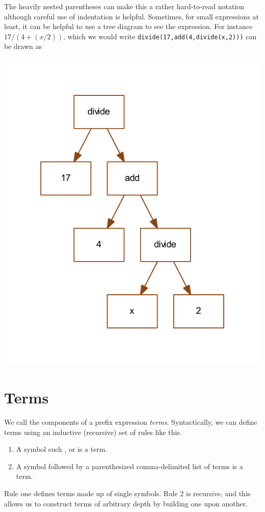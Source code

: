The heavily nested parentheses can make this a rather hard-to-read notation although careful use of indentation is helpful. Sometimes, for small expressions at least, it can be helpful to use a tree diagram to see the expression. For instance $17 / (4 + (x / 2)) $, which we would write \verb+divide(17,add(4,divide(x,2)))+ can be drawn as 
\begin{center}
\includegraphics[scale=0.5]{pdf/semtree20.pdf}
\end{center}

\section{Terms}
We call the components of a prefix expression {\em terms}. Syntactically, we can define terms using an inductive (recursive) set of rules like this.
\begin{enumerate}
\item A symbol such , \fbox{$\pi$} or \fbox{:=} is a term.
\item A symbol followed by a parenthesized comma-delimited list of terms is a term.
\end{enumerate}
Rule one defines terms made up of single symbols. Rule 2 is recursive,
and this allows us to construct terms of arbitrary depth by building
one upon another.

